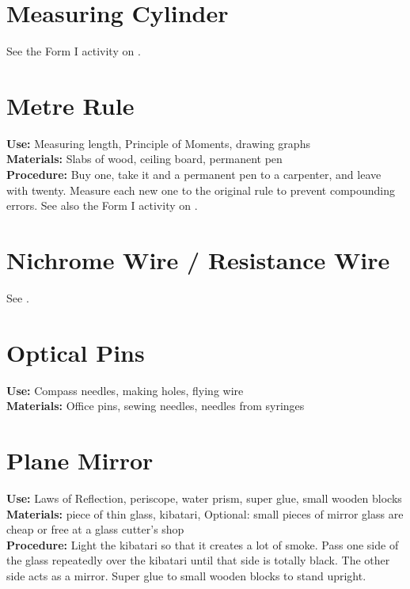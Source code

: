 \section*{Measuring Cylinder}
\label{sec:meascyl}
See the Form I activity on .

\section*{Metre Rule}
\vspace{-10pt}
\textbf{Use:} Measuring length, Principle of Moments, drawing graphs\\
\textbf{Materials:} Slabs of wood, ceiling board, permanent pen\\
\textbf{Procedure:} Buy one, take it and a permanent pen to a carpenter, and leave with twenty. Measure each new one to the original rule to prevent compounding errors. See also the Form I activity on .

\section*{Nichrome Wire / Resistance Wire}
\vspace{-10pt}
See .

\section*{Optical Pins}
\vspace{-10pt}
\textbf{Use:} Compass needles, making holes, flying wire\\
\textbf{Materials:} Office pins, sewing needles, needles from syringes

\section*{Plane Mirror}
\vspace{-10pt}
\textbf{Use:} Laws of Reflection, periscope, water prism, super glue, small wooden blocks\\
\textbf{Materials:} piece of thin glass, kibatari, Optional: small pieces of mirror glass are cheap or free at a glass cutter's shop\\
\textbf{Procedure:} Light the kibatari so that it creates a lot of smoke.  Pass one side of the glass repeatedly over the kibatari until that side is totally black.  The other side acts as a mirror. Super glue to small wooden blocks to stand upright.

